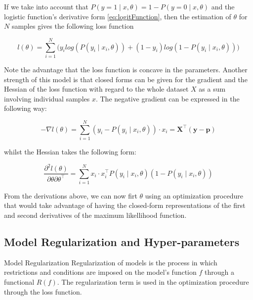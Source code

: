 If we take into account that $P(y=1 \mid x,\theta) = 1 - P(y=0 \mid x,\theta)$ and the logistic function's derivative form \cref{eq:logitFunction}, then the estimation of $\theta$ for $N$ samples gives the following loss function

\begin{equation}
l(\theta) = \sum_{i=1}^N \big(y_i log(P(y_i \mid x_i,\theta)) + (1-y_i)log(1 - P(y_i \mid x_i,\theta) ) \big)
\end{equation}

Note the advantage that the loss function is concave in the parameters. Another strength of this model is that closed forms can be given for the gradient and the Hessian of the loss function with regard to the whole dataset $X$ as a sum involving individual samples $x$. The negative gradient can be expressed in the following way: %

\begin{equation}
- \nabla l(\theta) = \sum_{i=1}^N (y_i - P(y_i \mid x_i,\theta))\cdot x_i = \textbf{X}^{\intercal}(\textbf{y}-\textbf{p})
\end{equation}

whilst the Hessian takes the following form:

\begin{equation}
\frac{\partial^2 l(\theta)}{\partial \theta \partial \theta^\intercal} = \sum_{i=1}^N x_i \cdot x_i^\intercal P(y_i \mid x_i,\theta)(1 -P(y_i \mid x_i,\theta))
\end{equation}

From the derivations above, we can now firt $\theta$ using an optimization procedure that would take advantage of having the closed-form representations of the first and second derivatives of the maximum likellihood function. 


\subsection{Model Regularization and Hyper-parameters} \label{subsection-hyperParametersRegularization}


\begin{definition}{Model Regularization}
Regularization of models is the process in which restrictions and conditions are imposed on the model's function $f$ through a functional $ R(f)$. The regularization term is used in the optimization procedure through the loss function.
\end{definition}

